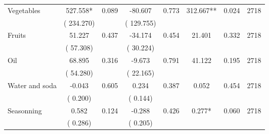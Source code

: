 \begin{tabular}{l*{7}{c}}
 Vegetables       &            527.558*       &        0.089  &            -80.607       &        0.773  &            312.667**       &              0.024 &  2718 \\ 
                       &       (     234.270)             &                               &       (     129.755)                     &                               &                                               &                                &                      \\ 

 Fruits       &             51.227       &        0.437  &            -34.174       &        0.454  &             21.401       &              0.332 &  2718 \\ 
                       &       (      57.308)             &                               &       (      30.224)                     &                               &                                               &                                &                      \\ 

 Oil       &             68.895       &        0.316  &             -9.673       &        0.791  &             41.122       &              0.195 &  2718 \\ 
                       &       (      54.280)             &                               &       (      22.165)                     &                               &                                               &                                &                      \\ 

 Water and soda       &             -0.043       &        0.605  &              0.234       &        0.387  &              0.052       &              0.454 &  2718 \\ 
                       &       (       0.200)             &                               &       (       0.144)                     &                               &                                               &                                &                      \\ 

 Seasonning       &              0.582       &        0.124  &             -0.288       &        0.426  &              0.277*       &              0.060 &  2718 \\ 
                       &       (       0.286)             &                               &       (       0.205)                     &                               &                                               &                                &                      \\ 


\end{tabular}
